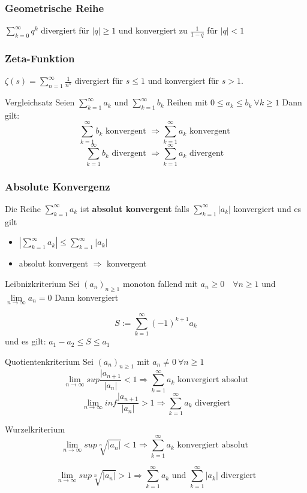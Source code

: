 \documentclass[a4paper,10pt]{article}
\def\limn{\lim\limits_{n\to \infty}}
\def\sumk{\sum\limits_{k=1}^{\infty}}
\begin{document}
\subsubsection{Geometrische Reihe} 
$\sum_{k=0}^\infty q^k$ divergiert für $|q| \ge 1$ und konvergiert zu $\frac{1}{1 - q}$ für $|q| < 1$
\subsubsection{Zeta-Funktion}
$\zeta(s) = \sum_{n=1}^\infty \frac{1}{n^s}$ divergiert für $s \le 1$ und konvergiert für $s > 1$.

\begin{mainbox}{Vergleichsatz}
  Seien $\sumk a_k$ und $\sumk b_k$ Reihen mit $0\leq a_k \leq b_k \> \forall k\geq 1$ Dann gilt:
  \[ \sumk b_k \text{ konvergent } \Rightarrow \sumk a_k \text{ konvergent }\]
  \[ \sumk b_k \text{ divergent } \Rightarrow \sumk a_k \text{ divergent }\]
  
\end{mainbox}

\subsubsection{Absolute Konvergenz}
Die Reihe $\sumk a_k$ ist \textbf{absolut konvergent} falls $\sumk|a_k|$ konvergiert und es gilt
\begin{itemize}
  \item $\left| \sumk a_k \right| \leq \sumk|a_k|$
  \item absolut konvergent $\Rightarrow$ konvergent
\end{itemize}

\begin{mainbox}{Leibnizkriterium}
  Sei $(a_n)_{n\geq 1}$ monoton fallend mit $a_n \geq 0 \quad \forall n\geq 1$ und $\limn a_n = 0$ Dann konvergiert \par
  \[S := \sumk (-1)^{k+1}a_k\]
  und es gilt: $a_1 - a_2 \leq S \leq a_1$
\end{mainbox}

\begin{mainbox}{Quotientenkriterium}
  Sei $(a_n)_{n\geq 1}$ mit $a_n \neq 0 \> \forall n \geq 1$
  \[\limn sup \frac{|a_{n+1}}{|a_n|} < 1 \Rightarrow \sumk a_k \text{ konvergiert absolut}\] 
  \[\limn inf \frac{|a_{n+1}}{|a_n|} > 1 \Rightarrow \sumk a_k \text{ divergiert}\] 
\end{mainbox}
\begin{mainbox}{Wurzelkriterium}
  \[\limn sup \sqrt[n]{|a_n|} < 1 \Rightarrow \sumk a_k \text{ konvergiert absolut }\] \par
  \[\limn sup \sqrt[n]{|a_n|} > 1 \Rightarrow \sumk a_k \text{ und } \sumk |a_k| \text{ divergiert}\]
\end{mainbox}
\end{document}
